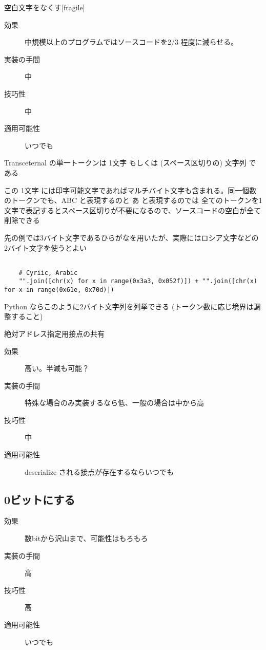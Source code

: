 \documentclass[12pt,unicode]{beamer}
\begin{document}
\begin{frame}{空白文字をなくす}[fragile]
   \begin{description}
      \item[効果] 中規模以上のプログラムではソースコードを2/3 程度に減らせる。
      \item[実装の手間] 中
      \item[技巧性] 中
      \item[適用可能性] いつでも
   \end{description}

   Transceternal の単一トークンは 1文字 もしくは (スペース区切りの) 文字列 である

   この 1文字 には印字可能文字であればマルチバイト文字も含まれる。同一個数のトークンでも、ABC と表現するのと あ と表現するのでは
   全てのトークンを1文字で表記するとスペース区切りが不要になるので、ソースコードの空白が全て削除できる

   先の例では3バイト文字であるひらがなを用いたが、実際にはロシア文字などの 2バイト文字を使うとよい

   \begin{verbatim}

    # Cyriic, Arabic
    "".join([chr(x) for x in range(0x3a3, 0x052f)]) + "".join([chr(x) for x in range(0x61e, 0x70d)])
    \end{verbatim}

    Python ならこのように2バイト文字列を列挙できる (トークン数に応じ境界は調整すること)
\end{frame}

\begin{frame}{絶対アドレス指定用接点の共有}
   \begin{description}
      \item[効果] 高い。半減も可能？
      \item[実装の手間] 特殊な場合のみ実装するなら低、一般の場合は中から高
      \item[技巧性] 中
      \item[適用可能性] deserialize される接点が存在するならいつでも
   \end{description}
\end{frame}
\subsection{0ビットにする}
\begin{frame}
   \begin{description}
      \item[効果] 数bitから沢山まで、可能性はもろもろ
      \item[実装の手間] 高
      \item[技巧性] 高
      \item[適用可能性] いつでも
   \end{description}
\end{frame}
\end{document}
